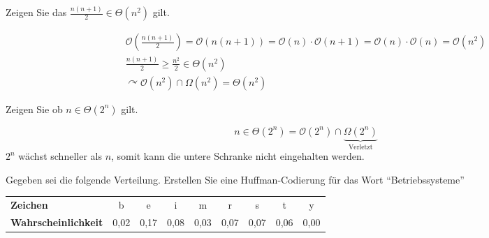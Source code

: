 \documentclass[a4paper,11pt]{exam}
\begin{document}
\begin{questions}
	\question Zeigen Sie das \(\frac{n(n+1)}{2} \in \Theta(n^{2})\) gilt.
	\begin{solution}
		\begin{eqnarray*}
			\mathcal{O}(\frac{n(n+1)}{2}) = \mathcal{O}(n(n+1)) = \mathcal{O}(n) \cdot \mathcal{O}(n+1) = \mathcal{O}(n) \cdot \mathcal{O}(n) = \mathcal{O}(n^{2}) \\
			\frac{n(n+1)}{2} \geq \frac{n^{2}}{2} \in \Theta(n^{2}) \\
			\curvearrowright \mathcal{O}(n^{2}) \cap \Omega(n^{2}) = \Theta(n^{2})
		\end{eqnarray*}
	\end{solution}

	\question Zeigen Sie ob \(n \in \Theta(2^n)\) gilt.
	\begin{solution}
		\[n \in \Theta(2^n) = \mathcal{O}(2^n) \cap \underbrace{\Omega(2^n)}_{\textrm{Verletzt}}\]
		\(2^n\) wächst schneller als \(n\), somit kann die untere Schranke nicht eingehalten werden.
	\end{solution}
	
	\question Gegeben sei die folgende Verteilung. Erstellen Sie eine Huffman-Codierung für das Wort ``Betriebssysteme''
	\begin{table}[htbp]
		\centering
		\begin{tabular}{l|cccccccc}
			\textbf{Zeichen}			& b	& e & i& m & r & s & t & y\\
			\textbf{Wahrscheinlichkeit}	& 0,02 & 0,17 & 0,08 & 0,03 & 0,07 & 0,07 & 0,06 & 0,00
		\end{tabular}
	\end{table}



\end{questions}
\end{document}
